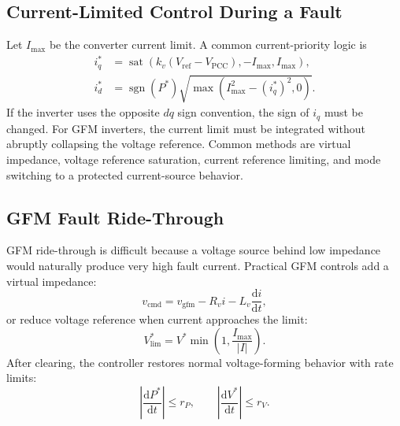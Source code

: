 \documentclass[11pt]{article}
\newcommand{\dd}{\mathrm{d}}
\begin{document}
\subsection{Current-Limited Control During a Fault}
Let $I_{\max}$ be the converter current limit. A common current-priority logic is
\begin{align}
i_q^{*} &= \operatorname{sat}\left(k_v(V_{\mathrm{ref}}-V_{\mathrm{PCC}}),
 -I_{\max}, I_{\max}\right),\\
i_d^{*} &= \operatorname{sgn}(P^{*})
\sqrt{\max\left(I_{\max}^2-(i_q^{*})^2,0\right)}.
\end{align}
If the inverter uses the opposite $dq$ sign convention, the sign of $i_q$ must be
changed. For GFM inverters, the current limit must be integrated without abruptly
collapsing the voltage reference. Common methods are virtual impedance, voltage
reference saturation, current reference limiting, and mode switching to a
protected current-source behavior.

\subsection{GFM Fault Ride-Through}
GFM ride-through is difficult because a voltage source behind low impedance would
naturally produce very high fault current. Practical GFM controls add a virtual
impedance:
\begin{equation}
v_{\mathrm{cmd}}=v_{\mathrm{gfm}}-R_v i-L_v\frac{\dd i}{\dd t},
\end{equation}
or reduce voltage reference when current approaches the limit:
\begin{equation}
V^{*}_{\mathrm{lim}}=V^{*}\min\left(1,\frac{I_{\max}}{|I|}\right).
\end{equation}
After clearing, the controller restores normal voltage-forming behavior with
rate limits:
\begin{equation}
\left|\frac{\dd P^{*}}{\dd t}\right|\le r_P,\qquad
\left|\frac{\dd V^{*}}{\dd t}\right|\le r_V.
\end{equation}
\end{document}
